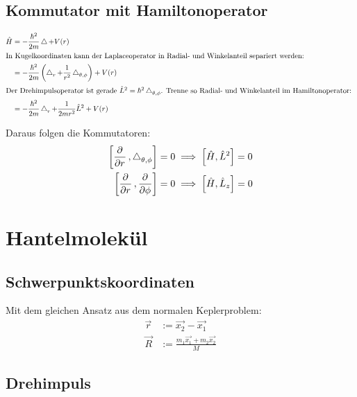 \subsection{Kommutator mit Hamiltonoperator}

\begin{align*}
	\hat H
	&= - \frac{\hbar^2}{2m} \laplace + V(r) \\
	\intertext{%
		In Kugelkoordinaten kann der Laplaceoperator in Radial- und
		Winkelanteil separiert werden:
	}
	&= - \frac{\hbar^2}{2m} \del{\laplace_r + \frac{1}{r^2} \laplace_{\theta,\phi}} + V(r) \\
	\intertext{%
		Der Drehimpulsoperator ist gerade $\hat L^2 = \hbar^2
		\laplace_{\theta,\phi}$. Trenne so Radial- und Winkelanteil im
		Hamiltonoperator:
	}
	&= - \frac{\hbar^2}{2m} \laplace_r + \frac{1}{2mr^2} \hat L^2 + V(r)
\end{align*}

Daraus folgen die Kommutatoren:
\begin{align*}
	\sbr{\dpd{}r, \laplace_{\theta,\phi}} = 0
	&\implies
	\sbr{\hat H, \hat L^2} = 0 \\
	\sbr{\dpd{}r, \dpd{}\phi} = 0
	&\implies
	\sbr{\hat H, \hat L_z} = 0
\end{align*}


\section{Hantelmolekül}

\subsection{Schwerpunktskoordinaten}

Mit dem gleichen Ansatz aus dem normalen Keplerproblem:
\begin{align*}
	\vec r &:= \vec{x_2} - \vec{x_1} \\
	\vec R &:= \frac{m_1 \vec{x_1} + m_2 \vec{x_2}}M
\end{align*}

\fehlt

\subsection{Drehimpuls}

